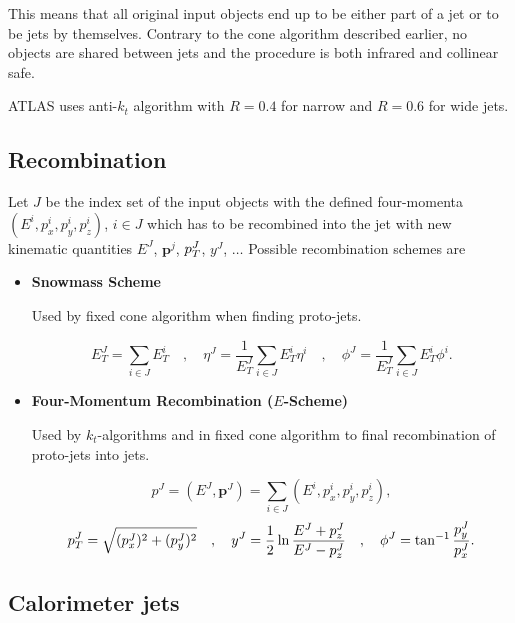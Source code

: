 This means that all original input objects end up to be either part of a jet or
to be jets by themselves. Contrary to the cone algorithm described earlier, no
objects are shared between jets and the procedure is both infrared and collinear
safe.

ATLAS uses anti-$k_t$ algorithm with $R=0.4$ for narrow and $R=0.6$ for wide
jets.

\subsection{Recombination}
\label{sse:Recombination}

Let $J$ be the index set of the input objects with the defined four-momenta
$(E^i,p_x^i,p_y^i,p_z^i)$, $i \in J$ which has to be recombined into the jet
with new kinematic quantities $E^J$, $\mathbf{p}^j$, $p_{T}^J$, $y^J$, $\ldots$
Possible recombination schemes are

\begin{itemize}
\item \textbf{Snowmass Scheme}

Used by fixed cone algorithm when finding proto-jets.

\begin{equation}
  E_T^J = \sum_{i \in J} E_T^i
  \quad , \quad
  \eta^J = \frac{1}{E_T^J} \sum_{i \in J} E_T^i \eta^i
  \quad , \quad
  \phi^J = \frac{1}{E_T^J} \sum_{i \in J} E_T^i \phi^i.
\end{equation}

\item \textbf{Four-Momentum Recombination ($E$-Scheme)}

Used by $k_t$-algorithms and in fixed cone algorithm to final recombination of
proto-jets into jets.

\begin{equation}
  p^J = ( E^J, \mathbf{p}^J ) = \sum_{i \in J} (E^i,p_x^i,p_y^i,p_z^i),
\end{equation}
\begin{equation}
  p_{T}^J = \sqrt{(p_x^J)^2 + (p_y^J)^2}
  \quad , \quad
  y^J = \frac{1}{2} \ln \frac{E^J + p_z^J}{E^J - p_z^J}
  \quad , \quad
  \phi^J = \tan^{-1} \frac{p_y^J}{p_x^J}.
\end{equation}
\end{itemize}

\subsection{Calorimeter jets}
\label{sse:CalorimeterJets}

